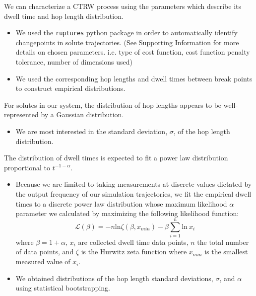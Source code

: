 \documentclass{article}
\begin{document}
  \noindent We can characterize a CTRW process using the parameters which describe its
  dwell time and hop length distribution.  %
  \begin{itemize}
	\item We used the \texttt{ruptures} python package in order to automatically identify
	changepoints in solute trajectories.\cite{truong_ruptures:_2018} (See Supporting
	Information for more details on chosen parameters. i.e. type of cost function, 
	cost function penalty tolerance, number of dimensions used)
	\item We used the corresponding hop lengths and dwell times between break points
	to construct empirical distributions.
  \end{itemize}
	
  For solutes in our system, the distribution of hop lengths appears to be
  well-represented by a Gaussian distribution.~\cite{metzler_random_2000,
  metzler_anomalous_2014,neusius_subdiffusion_2009}  %
  \begin{itemize}
	\item We are most interested in the standard deviation, $\sigma$, of the 
	hop length distribution.
  \end{itemize}
  
  \noindent The distribution of dwell times is expected to fit a power law
  distribution proportional to $t^{-1-\alpha}$.~\cite{meroz_toolbox_2015}
  \begin{itemize}
	\item Because we are limited to taking measurements at discrete values
	dictated by the output frequency of our simulation trajectories, we fit the
	empirical dwell times to a discrete power law distribution whose maximum
	likelihood $\alpha$ parameter we calculated by maximizing the following
	likelihood function: 
        \begin{equation}
	\mathcal{L}(\beta) = -n\text{ln}\zeta(\beta, x_{min}) -
	\beta\sum_{i=1}^{n} \text{ln}~x_i 
	\label{eqn:powerlaw_likelihood}
	\end{equation}
	where $\beta = 1 + \alpha$, $x_i$ are collected dwell time data points,
	$n$ the total number of data points, and $\zeta$ is the Hurwitz zeta function
	where $x_{min}$ is the smallest measured value of
	$x_i$.~\cite{clauset_power-law_2009} 
	\item We obtained distributions of the hop length standard deviations, $\sigma$, and
	$\alpha$ using statistical bootstrapping.\cite{efron_introduction_1994} 
  \end{itemize}
  
\end{document}
